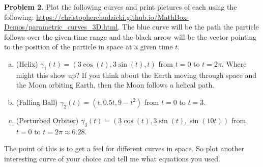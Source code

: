 \documentclass[12pt]{report} %
\theoremstyle{definition}
\begin{document}
\noindent\textbf{Problem 2.} Plot the following curves and print pictures of each using the following: \url{https://christopherchudzicki.github.io/MathBox-Demos/parametric_curves_3D.html}. The blue curve will be the path the particle follows over the given time range and the black arrow will be the vector pointing to the position of the particle in space at a given time $t$.
\begin{enumerate}[(a)]
    \item (Helix) $\gamma_1(t)=(3\cos(t),3\sin(t),t)$ from $t=0$ to $t=2\pi$. Where might this show up? If you think about the Earth moving through space and the Moon orbiting Earth, then the Moon follows a helical path.
    \item (Falling Ball) $\gamma_2(t)=(t,0.5t, 9-t^2)$ from $t=0$ to $t=3$.
    \item (Perturbed Orbiter) $\gamma_3(t)=(3\cos(t),3\sin(t),\sin(10t))$ from $t=0$ to $t=2\pi\approx 6.28$. 
\end{enumerate}
The point of this is to get a feel for different curves in space.  So plot another interesting curve of your choice and tell me what equations you used.
\end{document}
